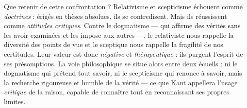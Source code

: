 \documentclass[11pt]{article}
\newcommand{\cle}[1]{{\popxbold\color{popdark}#1}}
\begin{document}
Que retenir de cette confrontation ? Relativisme et scepticisme échouent comme \emph{doctrines} : érigés en thèses absolues, ils se contredisent. Mais ils réussissent comme \emph{attitudes critiques}. Contre le \cle{dogmatisme} — qui affirme des vérités sans les avoir examinées et les impose aux autres —, le relativiste nous rappelle la diversité des points de vue et le sceptique nous rappelle la fragilité de nos certitudes. Leur valeur est donc \emph{négative} et \emph{thérapeutique} : ils purgent l'esprit de ses présomptions. La voie philosophique se situe alors entre deux écueils : ni le dogmatisme qui prétend tout savoir, ni le scepticisme qui renonce à savoir, mais la recherche rigoureuse et humble de la vérité — ce que Kant appellera l'usage \emph{critique} de la raison, capable de connaître tout en reconnaissant ses propres limites.
\end{document}

